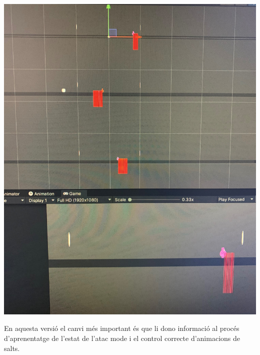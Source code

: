 \documentclass{article}
\begin{document}
        \includegraphics[width=1\textwidth]{images/v2/entrenamiento-multiple.jpg}
        
     \newpage
     
     En aquesta versió el canvi més important és que li dono informació al procés d'aprenentatge de l'estat de l'atac mode i el control correcte d'animacions de salts.
     
\end{document}
